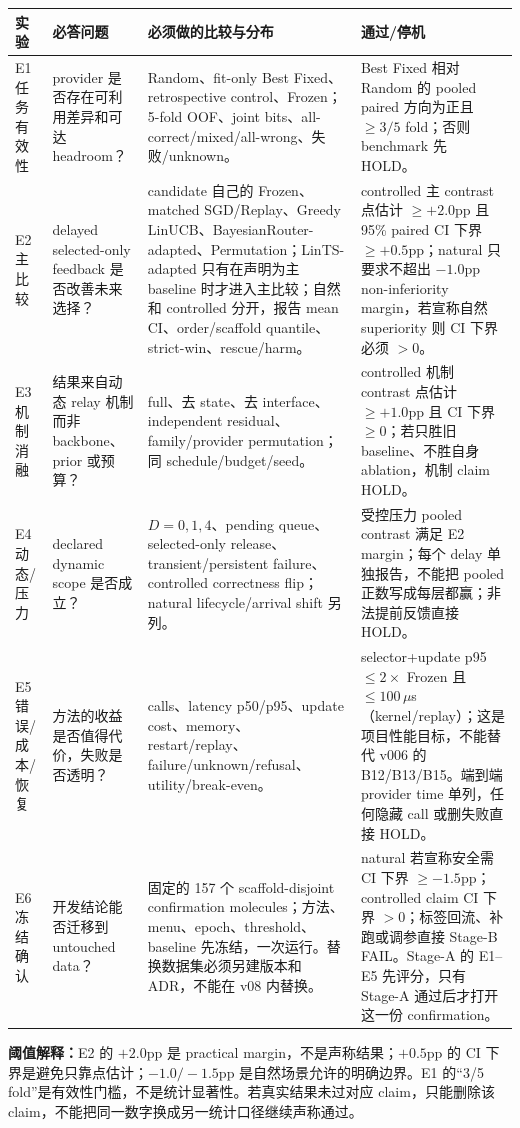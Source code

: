 \documentclass[10pt,letterpaper]{article}
\newcommand{\sect}[1]{\vspace{4pt}{\large\bfseries\color{GuideBlue}#1}\par\vspace{2pt}}
\newenvironment{clean}{\begin{center}\fontsize{8.55}{10.05}\selectfont\setlength{\tabcolsep}{3.7pt}\renewcommand{\arraystretch}{1.04}}{\end{center}}
\begin{document}
\sect{7. E1--E6 目标矩阵：做完它才有资格关门}
\begin{clean}
\begin{tabular}{@{}p{.09\linewidth}p{.25\linewidth}p{.40\linewidth}p{.15\linewidth}@{}}
\toprule
实验 & 必答问题 & 必须做的比较与分布 & 通过/停机\\
\midrule
E1 任务有效性 & provider 是否存在可利用差异和可达 headroom？ & Random、fit-only Best Fixed、retrospective control、Frozen；5-fold OOF、joint bits、all-correct/mixed/all-wrong、失败/unknown。 & Best Fixed 相对 Random 的 pooled paired 方向为正且 $\ge3/5$ fold；否则 benchmark 先 HOLD。\\
E2 主比较 & delayed selected-only feedback 是否改善未来选择？ & candidate 自己的 Frozen、matched SGD/Replay、Greedy LinUCB、BayesianRouter-adapted、Permutation；LinTS-adapted 只有在声明为主 baseline 时才进入主比较；自然和 controlled 分开，报告 mean CI、order/scaffold quantile、strict-win、rescue/harm。 & controlled 主 contrast 点估计 $\ge+2.0$pp 且 95\% paired CI 下界 $\ge+0.5$pp；natural 只要求不超出 $-1.0$pp non-inferiority margin，若宣称自然 superiority 则 CI 下界必须 $>0$。\\
E3 机制消融 & 结果来自动态 relay 机制而非 backbone、prior 或预算？ & full、去 state、去 interface、independent residual、family/provider permutation；同 schedule/budget/seed。 & controlled 机制 contrast 点估计 $\ge+1.0$pp 且 CI 下界 $\ge0$；若只胜旧 baseline、不胜自身 ablation，机制 claim HOLD。\\
E4 动态/压力 & declared dynamic scope 是否成立？ & $D=0,1,4$、pending queue、selected-only release、transient/persistent failure、controlled correctness flip；natural lifecycle/arrival shift 另列。 & 受控压力 pooled contrast 满足 E2 margin；每个 delay 单独报告，不能把 pooled 正数写成每层都赢；非法提前反馈直接 HOLD。\\
E5 错误/成本/恢复 & 方法的收益是否值得代价，失败是否透明？ & calls、latency p50/p95、update cost、memory、restart/replay、failure/unknown/refusal、utility/break-even。 & selector+update p95 $\le2\times$ Frozen 且 $\le100\,\mu$s（kernel/replay）；这是项目性能目标，不能替代 v006 的 B12/B13/B15。端到端 provider time 单列，任何隐藏 call 或删失败直接 HOLD。\\
E6 冻结确认 & 开发结论能否迁移到 untouched data？ & 固定的 157 个 scaffold-disjoint confirmation molecules；方法、menu、epoch、threshold、baseline 先冻结，一次运行。替换数据集必须另建版本和 ADR，不能在 v08 内替换。 & natural 若宣称安全需 CI 下界 $\ge-1.5$pp；controlled claim CI 下界 $>0$；标签回流、补跑或调参直接 Stage-B FAIL。Stage-A 的 E1--E5 先评分，只有 Stage-A 通过后才打开这一份 confirmation。\\
\bottomrule
\end{tabular}
\end{clean}
\textbf{阈值解释：}E2 的 $+2.0$pp 是 practical margin，不是声称结果；$+0.5$pp 的 CI 下界是避免只靠点估计；$-1.0/-1.5$pp 是自然场景允许的明确边界。E1 的“3/5 fold”是有效性门槛，不是统计显著性。若真实结果未过对应 claim，只能删除该 claim，不能把同一数字换成另一统计口径继续声称通过。
\end{document}

